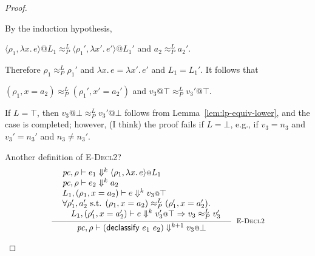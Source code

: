 \documentclass{article}
\makeatletter
\newcommand{\at}{\ensuremath{{\scriptstyle{@}}}}
\newcommand{\pc}{\ensuremath{{\mathit{pc}}}}
\theoremstyle{definition}
\makeatother
\begin{document}
\begin{proof}
\begin{description}
    By the induction hypothesis,
    \begin{description}
    \item
      \quad
      $\langle{\rho_1, \lambda{x}.\, e\rangle} \at L_1
      \approx^{L}_{P}
      \langle{\rho_1', \lambda{x'}.\, e'\rangle} \at L_1'$
      \quad and \quad
      $a_2 \approx^{L}_{P} a_2'$.
    \end{description}
    Therefore $\rho_1 \approx^{L}_{P} \rho_1'$ and
    $\lambda{x}.\, e = \lambda{x'}.\, e'$ and
    $L_1 = L_1'$.
    It follows that
    \begin{description}
    \item
      \quad
      $(\rho_1, x = a_2) \approx^{L}_{P} (\rho_1', x' = a_2')$
      \quad\quad\quad and \quad
      $v_3 \at \top \approx^{L}_{P} v_3' \at \top$.
    \end{description}
    If $L = \top$, then $v_3 \at \bot \approx^{L}_{P} v_3' \at \bot$ follows
    from Lemma~\ref{lem:lp-equiv-lower}, and the case is completed; however,
    (I think) the proof fails if $L = \bot$, e.g., if $v_3 = n_3$ and
    $v_3' = n_3'$ and $n_3 \not= n_3'$.

    Another definition of \textsc{E-Decl2}?
    \[
    \inference{
      {\begin{array}{l}
          \pc, \rho |- e_1 \Downarrow^{k}
          \langle{\rho_1, \lambda{x}.\, e\rangle} \at L_1
          \\
          \pc, \rho |- e_2 \Downarrow^{k} a_2
          \\
          L_1, (\rho_1, x = a_2) |- e \Downarrow^{k} v_3 \at \top
          \\
          \forall{\rho_1', a_2' \text{ s.t. }
            (\rho_1, x = a_2) \approx^{L}_{P} (\rho_1', x = a_2')}.\,
          \\\quad
          L_1, (\rho_1', x = a_2') |- e \Downarrow^{k} v_3' \at \top =>
          v_3 \approx^{L}_{P} v_3'
        \end{array}}
    }{
      \pc, \rho |- (\mathsf{declassify}\ e_1\ e_2) \Downarrow^{k+1} v_3 \at \bot
    }[\textsc{E-Decl2}]
    \]
  \end{description}
\end{proof}
\end{document}
